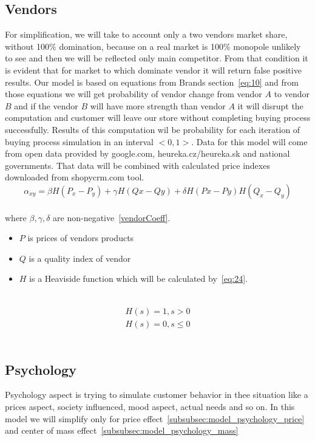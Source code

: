 \subsection{Vendors} \label{subsec:model_vendors}
For simplification, we will take to account only a two vendors market share, without 100\% domination, because on a real
market is 100\% monopole unlikely to see and then we will be reflected only main competitor.
From that condition it is evident that for market to which dominate vendor it will return false positive results.
Our model is based on equations from Brands section~\ref{eq:10} and from those equations we will get probability of vendor
change from vendor $A$ to vendor $B$ and if the vendor $B$ will have more strength than vendor $A$ it will disrupt the
computation and customer will leave our store without completing buying process successfully.
Results of this computation wil be probability for each iteration of buying process simulation in an interval $<0,1>$.
Data for this model will come from open data provided by google.com, heureka.cz/heureka.sk and national governments.
That data will be combined with calculated price indexes downloaded from shopycrm.com tool.
\\
\begin{equation} \label{eq:24}
\alpha_{xy} = \beta H(P_x-P_y) + \gamma H(Qx-Qy) + \delta H(Px-Py)H(Q_x - Q_y)
\end{equation}
\\
where $\beta, \gamma, \delta$ are non-negative~\ref{vendorCoeff}.
\\
\begin{itemize}
    \item $P$ is prices of vendors products
    \item $Q$ is a quality index of vendor
    \item $H$ is a Heaviside function which will be calculated by~\ref{eq:24}.
\end{itemize}
\\
\begin{eqnarray} \label{eq:25}
H(s) = 1, s > 0 \\
H (s) = 0, s \leq 0
\end{eqnarray}
\\
\subsection{Psychology} \label{subsec:model_psychology}
Psychology aspect is trying to simulate customer behavior in thee situation like a prices aspect, society influenced, mood aspect, actual needs
and so on.
In this model we will simplify only for price effect~\ref{subsubsec:model_psychology_price} and center of mass effect~\ref{subsubsec:model_psychology_mass}
